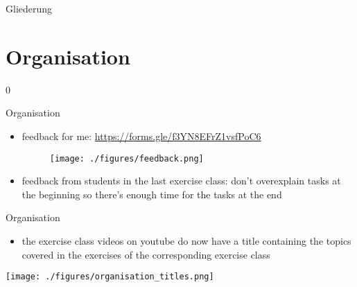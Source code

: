 \def\pascal{0}
\def\preview{1}









\begin{withoutheadline}
  \begin{withoutfootline}
    \begin{frame}
      \titlepagesecond
    \end{frame}
  \end{withoutfootline}

  \begin{frame}[shrink=10]{Gliederung}
    \tableofcontents[hideallsubsections]
  \end{frame}
\end{withoutheadline}

\setcounter{section}{-1}

\section{Organisation}

\if\pascal0{
  \begin{frame}{Organisation}
    \begin{itemize}
      \item \alert{feedback for me:} \url{https://forms.gle/f3YN8EFrZ1vsfPoC6}
      \begin{figure}
        \centering
        \texttt{[image: ./figures/feedback.png]}
      \end{figure}
      \item \alert{feedback from students in the last exercise class:} don't overexplain tasks at the beginning so there's enough time for the tasks at the end
    \end{itemize}
  \end{frame}
  \begin{frame}[allowframebreaks]{Organisation}
    \begin{itemize}
      \item the exercise class videos on youtube do now have a title containing the topics covered in the exercises of the corresponding exercise class
    \end{itemize}
    \texttt{[image: ./figures/organisation\_titles.png]}
  \end{frame}
}\fi

